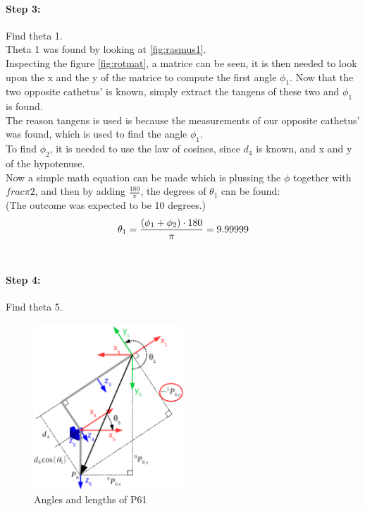 \paragraph{Step 3:} Find theta 1.\\
Theta 1 was found by looking at \ref{fig:rasmus1}.\\ Inspecting the figure \ref{fig:rotmat}, a matrice can be seen, it is then needed to look upon the x and the y of the matrice to compute the first angle $\phi_1$. Now that the two opposite cathetus' is known, simply extract the tangens of these two and $\phi_1$ is found.\\
The reason tangens is used is because the measurements of our opposite cathetus' was found, which is used to find the angle $\phi_1$.\\
To find $\phi_2$, it is needed to use the law of cosines, since $d_4$ is known, and x and y of the hypotenuse.\\
Now a simple math equation can be made which is plussing the $\phi$ together with $frac{\pi}{2}$, and then by adding $\frac{180}{\pi}$, the degrees of $\theta_1$ can be found:\\
(The outcome was expected to be 10 degrees.)\\

\begin{equation}
\centering
\theta_1 = \frac{(\phi_1+\phi_2)\cdot180}{\pi} = 9.99999
\end{equation}\\


\paragraph{Step 4:} Find theta 5.\\

\begin{figure}[H]
    \centering
    \includegraphics[width=0.5\textwidth]{Design/06.png}
    \caption{Angles and lengths of P61 \cite{Rasmus}} 
    \label{fig:rasmus2} 
\end{figure}

